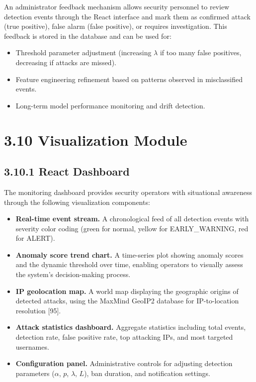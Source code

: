 \documentclass[
  a4paper]{report}
\providecommand{\tightlist}{%
  \setlength{\itemsep}{0pt}\setlength{\parskip}{0pt}}
\begin{document}
An administrator feedback mechanism allows security personnel to review
detection events through the React interface and mark them as confirmed
attack (true positive), false alarm (false positive), or requires
investigation. This feedback is stored in the database and can be used
for:

\begin{itemize}
\tightlist
\item
  Threshold parameter adjustment (increasing \(\lambda\) if too many
  false positives, decreasing if attacks are missed).
\item
  Feature engineering refinement based on patterns observed in
  misclassified events.
\item
  Long-term model performance monitoring and drift detection.
\end{itemize}

\section{3.10 Visualization Module}\label{visualization-module}

\subsection{3.10.1 React Dashboard}\label{react-dashboard}

The monitoring dashboard provides security operators with situational
awareness through the following visualization components:

\begin{itemize}
\tightlist
\item
  \textbf{Real-time event stream.} A chronological feed of all detection
  events with severity color coding (green for normal, yellow for
  EARLY\_WARNING, red for ALERT).
\item
  \textbf{Anomaly score trend chart.} A time-series plot showing anomaly
  scores and the dynamic threshold over time, enabling operators to
  visually assess the system's decision-making process.
\item
  \textbf{IP geolocation map.} A world map displaying the geographic
  origins of detected attacks, using the MaxMind GeoIP2 database for
  IP-to-location resolution {[}95{]}.
\item
  \textbf{Attack statistics dashboard.} Aggregate statistics including
  total events, detection rate, false positive rate, top attacking IPs,
  and most targeted usernames.
\item
  \textbf{Configuration panel.} Administrative controls for adjusting
  detection parameters (\(\alpha\), \(p\), \(\lambda\), \(L\)), ban
  duration, and notification settings.
\end{itemize}
\end{document}
